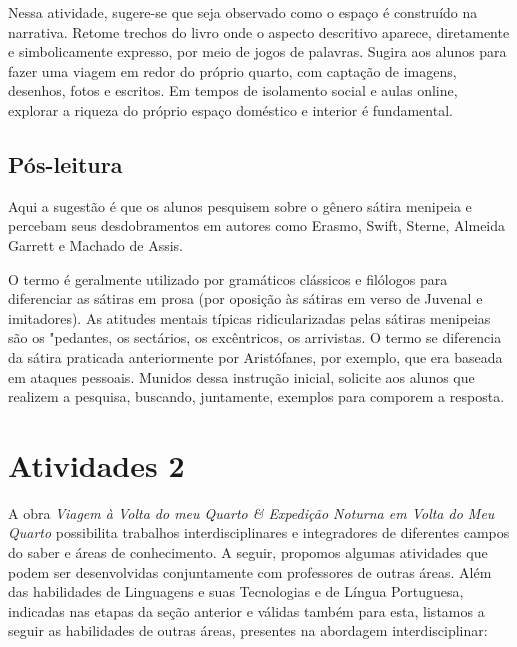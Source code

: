 \documentclass[12pt]{extarticle}
\begin{document}

Nessa atividade, sugere-se que seja observado como o espaço
é construído na narrativa. Retome trechos do livro onde o aspecto
descritivo aparece, diretamente e simbolicamente expresso, por meio de
jogos de palavras. Sugira aos alunos para fazer uma viagem em redor do
próprio quarto, com captação de imagens, desenhos, fotos e escritos. Em
tempos de isolamento social e aulas online, explorar a riqueza do
próprio espaço doméstico e interior é fundamental.

\subsection{Pós-leitura}


Aqui a sugestão é que os alunos pesquisem sobre o gênero
sátira menipeia e percebam seus desdobramentos em autores como Erasmo,
Swift, Sterne, Almeida Garrett e Machado de Assis.

O termo é geralmente utilizado por gramáticos clássicos e filólogos para
diferenciar as sátiras em prosa (por oposição às sátiras em verso de
Juvenal e imitadores). As atitudes mentais típicas ridicularizadas pelas
sátiras menipeias são os "pedantes, os sectários, os excêntricos, os
arrivistas. O termo se diferencia da sátira praticada anteriormente por
Aristófanes, por exemplo, que era baseada em ataques pessoais. Munidos
dessa instrução inicial, solicite aos alunos que realizem a pesquisa,
buscando, juntamente, exemplos para comporem a resposta.

\section{Atividades 2}


A obra \emph{Viagem à Volta do meu Quarto \& Expedição Noturna em Volta
do Meu Quarto} possibilita trabalhos interdisciplinares e integradores
de diferentes campos do saber e áreas de conhecimento. A seguir,
propomos algumas atividades que podem ser desenvolvidas conjuntamente
com professores de outras áreas. Além das habilidades de Linguagens e
suas Tecnologias e de Língua Portuguesa, indicadas nas etapas da seção
anterior e válidas também para esta, listamos a seguir as habilidades de
outras áreas, presentes na abordagem interdisciplinar:
\end{document}
